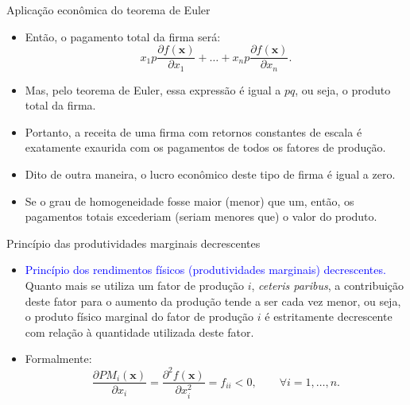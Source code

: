 \documentclass[10pt]{beamer}
\begin{document}
\begin{frame}{Aplicação econômica do teorema de Euler}
    \begin{itemize}
        \item Então, o pagamento total da firma será:
        \[
        x_1 p \frac{\partial f(\mathbf{x})}{\partial x_1} + \dots + x_n p \frac{\partial f(\mathbf{x})}{\partial x_n}.
        \]
         
        \item Mas, pelo teorema de Euler, essa expressão é igual a $pq$, ou seja, o produto total da firma.
        \bigskip
        \item Portanto, a receita de uma firma com retornos constantes de escala é exatamente exaurida com os pagamentos de todos os fatores de produção.
        \bigskip
        \item Dito de outra maneira, o lucro econômico deste tipo de firma é igual a zero.
        \bigskip
        \item Se o grau de homogeneidade fosse maior (menor) que um, então, os pagamentos totais excederiam (seriam menores que) o valor do produto.
    \end{itemize}
\end{frame}

\begin{frame}{Princípio das produtividades marginais decrescentes}
    \begin{itemize}
        \item \textcolor{blue}{Princípio dos rendimentos físicos (produtividades marginais) decrescentes.} Quanto mais se utiliza um fator de produção $i$, \emph{ceteris paribus}, a contribuição deste fator para o aumento da produção tende a ser cada vez menor, ou seja, o produto físico marginal do fator de produção $i$ é estritamente decrescente com relação à quantidade utilizada deste fator.
        \bigskip
        \item Formalmente:
        \begin{equation}
            \frac{\partial PM_i(\mathbf{x})}{\partial x_i} = \frac{\partial^2 f(\mathbf{x})}{\partial x_i^2} = f_{ii} < 0, \qquad \forall i = 1, \dots, n.
        \end{equation}
    \end{itemize}
\end{frame}
\end{document}
